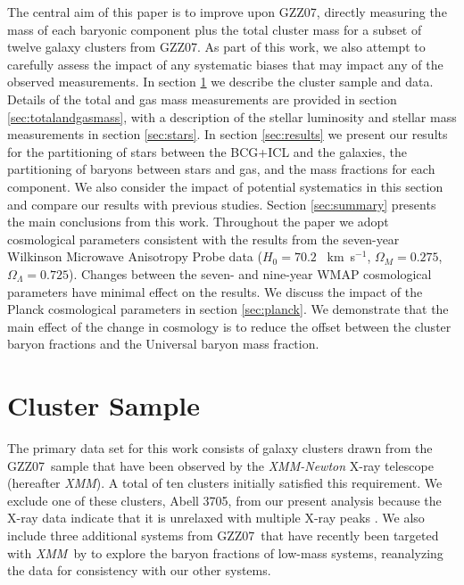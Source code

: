 \documentclass[preprint]{emulateapj}
\newcommand{\kms}{~km~s$^{-1}$}
\newcommand\ptwo{GZZ07}
\newcommand{\xmm}{\textit{XMM}}
\begin{document}
The central aim of this paper is to improve upon \ptwo, directly
measuring the mass of each baryonic component plus the total cluster
mass for a subset of twelve galaxy clusters from \ptwo. As part of
this work, we also attempt to carefully assess the impact of any
systematic biases that may impact any of the observed measurements. In
section \ref{sec:sample} we describe the cluster sample and
data. Details of the total and gas mass measurements are provided in
section \ref{sec:totalandgasmass}, with a description of the stellar
luminosity and stellar mass measurements in section \ref{sec:stars}.
In section \ref{sec:results} we present our results for the
partitioning of stars between the BCG+ICL and the galaxies, the
partitioning of baryons between stars and gas, and the mass fractions
for each component. We also consider the impact of potential
systematics in this section and compare our results with previous
studies. Section \ref{sec:summary} presents the main conclusions from
this work.  Throughout the paper we adopt cosmological parameters
consistent with the \citet{komatsu2011} results from the seven-year
Wilkinson Microwave Anisotropy Probe data ($H_0=70.2$ \kms, $\Omega_M=0.275$,$\Omega_\Lambda=0.725$).
Changes between the seven- and nine-year WMAP cosmological parameters \citep{bennett2012}
have minimal effect on the results. We discuss the impact of the Planck cosmological parameters \citep{planckcosmology2013}
in section \ref{sec:planck}. We demonstrate that the main effect
of the change in cosmology is to reduce the offset between the cluster baryon fractions and the Universal baryon mass fraction.



\section{Cluster Sample}
\label{sec:sample}
The primary data set for this work consists of galaxy clusters drawn
from the \ptwo\ sample that have been observed by the {\it XMM-Newton}
X-ray telescope (hereafter \xmm). A total of ten clusters initially
satisfied this requirement. We exclude one of these clusters, Abell
3705, from our present analysis because the X-ray data indicate that
it is unrelaxed with multiple X-ray peaks \citep{sivanandam2009}. We
also include three additional systems from \ptwo\ that have recently
been targeted with \xmm\ by \citet{sanderson2013} to explore the
baryon fractions of low-mass systems, reanalyzing the data for
consistency with our other systems.
\end{document}
